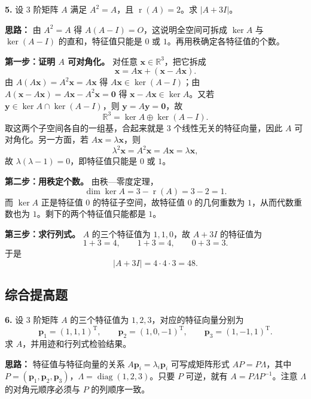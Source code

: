 \textbf{5.} 设 \(3\) 阶矩阵 \(A\) 满足 \(A^2=A\)，且 \(\operatorname{r}(A)=2\)。求 \(|A+3I|\)。

\ifshowsolutions%
\textbf{思路：} 由 \(A^2=A\) 得 \(A(A-I)=O\)，这说明全空间可拆成 \(\ker A\) 与 \(\ker(A-I)\) 的直和，特征值只能是 \(0\) 或 \(1\)。再用秩确定各特征值的个数。

\textbf{第一步：证明 \(A\) 可对角化。} 对任意 \(\mathbf{x}\in\mathbb{R}^3\)，把它拆成
\[
\mathbf{x}=A\mathbf{x}+(\mathbf{x}-A\mathbf{x}).
\]
由 \(A(A\mathbf{x})=A^2\mathbf{x}=A\mathbf{x}\) 得 \(A\mathbf{x}\in\ker(A-I)\)；由 \(A(\mathbf{x}-A\mathbf{x})=A\mathbf{x}-A^2\mathbf{x}=\mathbf{0}\) 得 \(\mathbf{x}-A\mathbf{x}\in\ker A\)。又若 \(\mathbf{y}\in\ker A\cap\ker(A-I)\)，则 \(\mathbf{y}=A\mathbf{y}=\mathbf{0}\)，故
\[
\mathbb{R}^3=\ker A\oplus\ker(A-I).
\]
取这两个子空间各自的一组基，合起来就是 \(3\) 个线性无关的特征向量，因此 \(A\) 可对角化。另一方面，若 \(A\mathbf{x}=\lambda\mathbf{x}\)，则
\[
\lambda^2\mathbf{x}=A^2\mathbf{x}=A\mathbf{x}=\lambda\mathbf{x},
\]
故 \(\lambda(\lambda-1)=0\)，即特征值只能是 \(0\) 或 \(1\)。

\textbf{第二步：用秩定个数。} 由秩—零度定理，
\[
\dim\ker A=3-\operatorname{r}(A)=3-2=1.
\]
而 \(\ker A\) 正是特征值 \(0\) 的特征子空间，故特征值 \(0\) 的几何重数为 \(1\)，从而代数重数也为 \(1\)。剩下的两个特征值只能都是 \(1\)。

\textbf{第三步：求行列式。} \(A\) 的三个特征值为 \(1,1,0\)，故 \(A+3I\) 的特征值为
\[
1+3=4,\qquad 1+3=4,\qquad 0+3=3.
\]
于是
\[
|A+3I|=4\cdot4\cdot3=48.
\]

\else \answerarea[8] \fi%

\subsection{综合提高题}

\textbf{6.} 设 \(3\) 阶矩阵 \(A\) 的三个特征值为 \(1,2,3\)，对应的特征向量分别为
\[
\mathbf{p}_1=(1,1,1)^{\mathrm{T}},\qquad
\mathbf{p}_2=(1,0,-1)^{\mathrm{T}},\qquad
\mathbf{p}_3=(1,-1,1)^{\mathrm{T}}.
\]
求 \(A\)，并用迹和行列式检验结果。

\ifshowsolutions%
\textbf{思路：} 特征值与特征向量的关系 \(A\mathbf{p}_i=\lambda_i\mathbf{p}_i\) 可写成矩阵形式 \(AP=P\Lambda\)，其中 \(P=(\mathbf{p}_1,\mathbf{p}_2,\mathbf{p}_3)\)，\(\Lambda=\operatorname{diag}(1,2,3)\)。只要 \(P\) 可逆，就有 \(A=P\Lambda P^{-1}\)。注意 \(\Lambda\) 的对角元顺序必须与 \(P\) 的列顺序一致。

